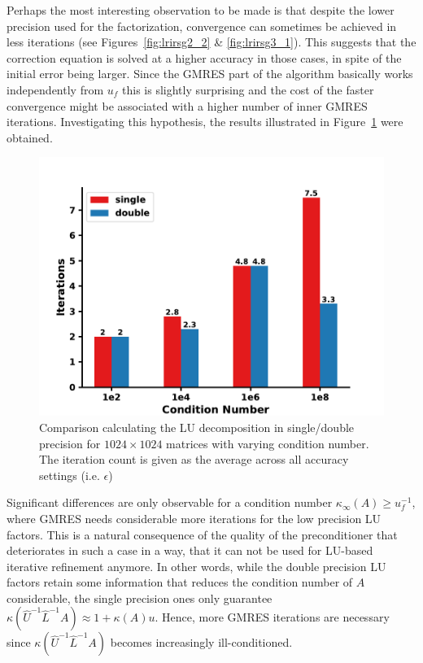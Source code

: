 Perhaps the most interesting observation to be made is that despite the lower precision used for the factorization, convergence can sometimes be achieved in less iterations (see Figures~\hyperref[fig:lrirsg2_2]{\ref{fig:lrirsg2_2}} \& \hyperref[fig:lrirsg3_1]{\ref{fig:lrirsg3_1}}). This suggests that the correction equation is solved at a higher accuracy in those cases, in spite of the initial error being larger. Since the GMRES part of the algorithm basically works independently from $u_f$ this is slightly surprising and the cost of the faster convergence might be associated with a higher number of inner GMRES iterations. Investigating this hypothesis, the results illustrated in Figure~\hyperref[fig:lr_irs_iter]{\ref{fig:lr_irs_iter}} were obtained.

\begin{figure}[h]
    \centering
    \includegraphics[width=0.7\linewidth]{chapters/5_experiments/figures/GMRES_iter.pdf}
    \caption[Mixed Precision Low-Rank IR - GMRES Iterations]{Comparison calculating the LU decomposition in single/double precision for $1024 \times 1024$ matrices with varying condition number. The iteration count is given as the average across all accuracy settings (i.e. $\epsilon$)}
    \label{fig:lr_irs_iter}
\end{figure}

Significant differences are only observable for a condition number $\kappa_\infty(A) \geq u_f^{-1}$, where GMRES needs considerable more iterations for the low precision LU factors. This is a natural consequence of the quality of the preconditioner that deteriorates in such a case in a way, that it can not be used for LU-based iterative refinement anymore. In other words, while the double precision LU factors retain some information that reduces the condition number of $A$ considerable, the single precision ones only guarantee $ \kappa(\hat{U}^{-1}\hat{L}^{-1}A)\approx 1 + \kappa(A)u$. Hence, more GMRES iterations are necessary since $\kappa(\hat{U}^{-1}\hat{L}^{-1}A)$ becomes increasingly ill-conditioned.

